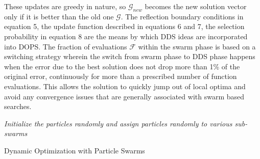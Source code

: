 \documentclass[12pt]{article}
\makeatletter
\renewcommand\section{\@startsection
	{subsection}{2}{0mm}
	{-0.2in}
	{0.05\baselineskip}
	{\normalfont\large\bfseries}}
\makeatother
\begin{document}
These updates are greedy in nature, so $\mathcal{G}_{new}$ becomes the new solution vector only if it is better than the old one $\mathcal{G}$. The reflection boundary conditions in equation 5, the update function described in equations 6 and 7, the selection probability in equation 8 are the means by which DDS ideas are incorporated into DOPS.
The fraction of evaluations $\mathcal{F}$  within the swarm phase is based on a switching strategy wherein the switch from swarm phase to DDS phase happens when the error due to the best solution does not drop more than 1\% of the original error, continuously for more than a prescribed number of function evaluations. This allows the solution to quickly jump out of local optima and avoid any convergence issues that are generally associated with swarm based searches.

\newpage
%

\IncMargin{1em}
\begin{algorithm}
\BlankLine
\emph{Initialize the particles randomly and assign particles randomly to various sub-swarms}\;
\caption{Dynamic Optimization with Particle Swarms}\label{algo_ddspso}
\end{algorithm}\DecMargin{1em}
\end{document}
